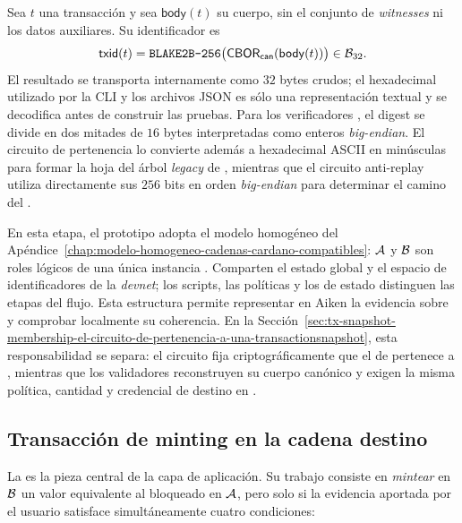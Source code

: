 \begin{definition}
\label{def:txid-canonico-cardano}
\normalfont
Sea $t$ una transacción y sea $\mathsf{body}(t)$ su cuerpo, sin el conjunto de \textit{witnesses} ni los datos auxiliares. Su identificador es
$$\mathsf{txid}(t)=\texttt{BLAKE2B-256}\bigl(\mathsf{CBOR}_{\mathsf{can}}(\mathsf{body}(t))\bigr)\in\mathcal{B}_{32}.$$
El resultado se transporta internamente como $32$ bytes crudos; el hexadecimal utilizado por la CLI y los archivos JSON es sólo una representación textual y se decodifica antes de construir las pruebas. Para los verificadores \Groth, el digest se divide en dos mitades de $16$ bytes interpretadas como enteros \textit{big-endian}. El circuito de pertenencia lo convierte además a hexadecimal ASCII en minúsculas para formar la hoja del árbol \textit{legacy} de \Mithril, mientras que el circuito anti-replay utiliza directamente sus $256$ bits en orden \textit{big-endian} para determinar el camino del \SMT.
\end{definition}

En esta etapa, el prototipo adopta el modelo homogéneo del Apéndice~\ref{chap:modelo-homogeneo-cadenas-cardano-compatibles}: $\mathcal{A}$ y $\mathcal{B}$ son roles lógicos de una única instancia \eUTxO. Comparten el estado global y el espacio de identificadores de la \textit{devnet}; los scripts, las políticas y los \UTxOs de estado distinguen las etapas del flujo. Esta estructura permite representar en Aiken la evidencia sobre \LockTx y comprobar localmente su coherencia. En la Sección~\ref{sec:tx-snapshot-membership-el-circuito-de-pertenencia-a-una-transactionsnapshot}, esta responsabilidad se separa: el circuito fija criptográficamente que el \TxId de \LockTx pertenece a \CardanoTransactions, mientras que los validadores reconstruyen su cuerpo canónico y exigen la misma política, cantidad y credencial de destino en \MintTx.

\subsection{Transacción de minting en la cadena destino}
\label{subsec:validadores-y-flujo-transaccional-transaccion-de-minting-en-la-cadena-destino}

La \MintTx es la pieza central de la capa de aplicación. Su trabajo consiste en \textit{mintear} en $\mathcal{B}$ un valor equivalente al bloqueado en $\mathcal{A}$, pero solo si la evidencia aportada por el usuario satisface simultáneamente cuatro condiciones:

